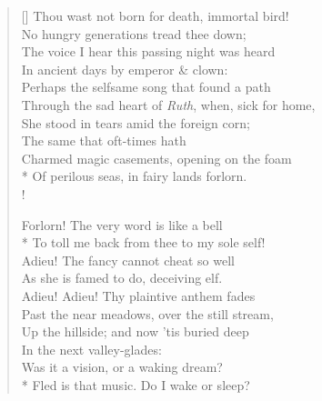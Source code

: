 \documentclass[MAIN]{subfiles}
\begin{document}
\begin{verse}[\versewidth]
Thou wast not born for death, immortal bird!\\
\vin No hungry generations tread thee down;\\
The voice I hear this passing night was heard\\
\vin In ancient days by emperor \& clown:\\
Perhaps the selfsame song that found a path\\
\vin Through the sad heart of \emph{Ruth}, when, sick for home,\\
\vin \vin She stood in tears amid the foreign corn;\\
\vin \vin \vin \vin The same that oft-times hath\\
\vin Charmed magic casements, opening on the foam\\*
\vin \vin Of perilous seas, in fairy lands forlorn.\\!

Forlorn! The very word is like a bell\\*
\vin To toll me back from thee to my sole self!\\
Adieu! The fancy cannot cheat so well\\
\vin As she is famed to do, deceiving elf.\\
Adieu! Adieu! Thy plaintive anthem fades\\
\vin Past the near meadows, over the still stream,\\
\vin \vin Up the hillside; and now 'tis buried deep\\
\vin \vin \vin \vin In the next valley-glades:\\
\vin Was it a vision, or a waking dream?\\*
\vin \vin Fled is that music. Do I wake or sleep?
\end{verse}
\end{document}
